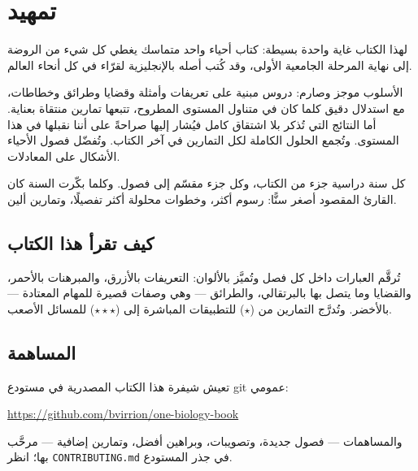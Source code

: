 \chapter{تمهيد}

لهذا الكتاب غاية واحدة بسيطة: كتاب أحياء واحد متماسك يغطي كل شيء من
الروضة إلى نهاية المرحلة الجامعية الأولى، وقد كُتب أصله بالإنجليزية
لقرّاء في كل أنحاء العالم.

الأسلوب موجز وصارم: دروس مبنية على تعريفات وأمثلة وقضايا وطرائق
وخطاطات، مع استدلال دقيق كلما كان في متناول المستوى المطروح، تتبعها تمارين
منتقاة بعناية. أما النتائج التي تُذكر بلا اشتقاق كامل فيُشار إليها صراحةً على
أننا نقبلها في هذا المستوى. وتُجمع الحلول الكاملة لكل التمارين في آخر الكتاب.
وتُفضّل فصول الأحياء الأشكال على المعادلات.

كل سنة دراسية جزء من الكتاب، وكل جزء مقسّم إلى فصول. وكلما بكّرت السنة
كان القارئ المقصود أصغر سنًّا: رسوم أكثر، وخطوات محلولة أكثر تفصيلًا،
وتمارين ألين.

\section*{كيف تقرأ هذا الكتاب}

تُرقَّم العبارات داخل كل فصل وتُميَّز بالألوان: التعريفات بالأزرق،
والمبرهنات بالأحمر، والقضايا وما يتصل بها بالبرتقالي، والطرائق --- وهي
وصفات قصيرة للمهام المعتادة --- بالأخضر. وتُدرَّج التمارين من ($\star$)
للتطبيقات المباشرة إلى ($\star\star\star$) للمسائل الأصعب.

\section*{المساهمة}

تعيش شيفرة هذا الكتاب المصدرية في مستودع git عمومي:
\begin{center}
\url{https://github.com/bvirrion/one-biology-book}
\end{center}
والمساهمات --- فصول جديدة، وتصويبات، وبراهين أفضل، وتمارين إضافية ---
مرحَّب بها؛ انظر \texttt{CONTRIBUTING.md} في جذر المستودع.

